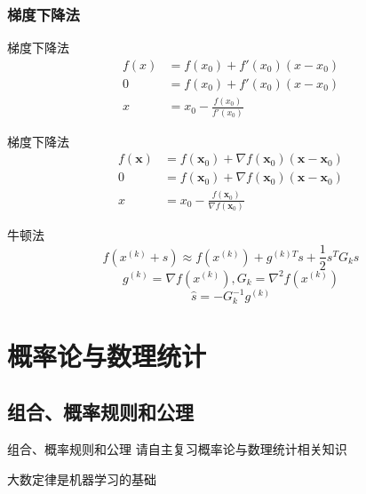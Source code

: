\documentclass{ctexbeamer}
\begin{document}
\subsubsection{梯度下降法}
\begin{frame}{梯度下降法}
    \begin{equation*}
        \begin{split}
        f(x) &= f(x_0) + f'(x_0)(x-x_0)\\
        0 &= f(x_0) + f'(x_0)(x-x_0)\\
        x &= x_0-\frac{f(x_0)}{f'(x_0)}
        \end{split}
    \end{equation*}
\end{frame}
\begin{frame}{梯度下降法}
    \begin{equation*}
        \begin{split}
        f(\boldsymbol x) &= f(\boldsymbol x_0) + \nabla f(\boldsymbol x_0)(\boldsymbol x-\boldsymbol x_0)\\
        0 &= f(\boldsymbol x_0) + \nabla f(\boldsymbol x_0)(\boldsymbol x-\boldsymbol x_0)\\
        x &= x_0-\frac{f(\boldsymbol x_0)}{\nabla f(\boldsymbol x_0)}
        \end{split}
    \end{equation*}
\end{frame}

\begin{frame}{牛顿法}
$$f(x^{(k)}+s)\approx f(x^{(k)})+g^{(k)T}s+\frac12s^TG_ks$$
$$g^{(k)}=\nabla f(x^{(k)}), G_k=\nabla^2f(x^{(k)})$$
$$\hat s=-G_k^{-1}g^{(k)}$$
\end{frame}





\section{概率论与数理统计}
\subsection{组合、概率规则和公理}
\begin{frame}{组合、概率规则和公理}
请自主复习概率论与数理统计相关知识

大数定律是机器学习的基础
\end{frame}
\end{document}
